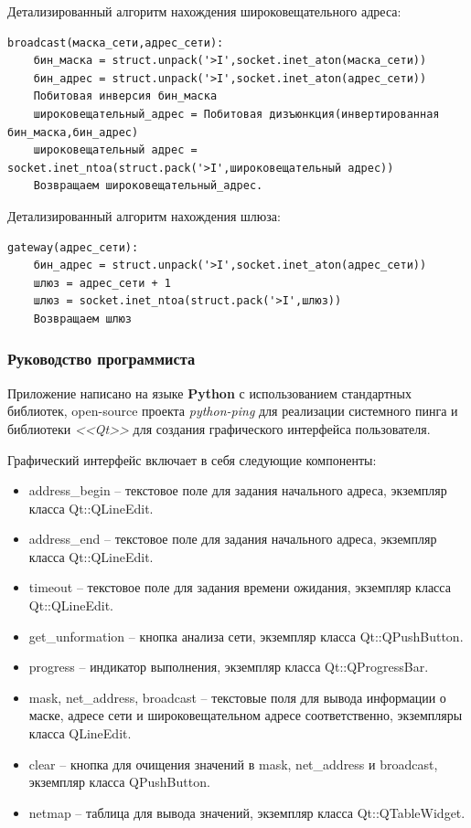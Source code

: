 \documentclass[a4paper]{article}
\begin{document}
Детализированный алгоритм нахождения широковещательного адреса:

\begin{verbatim}
broadcast(маска_сети,адрес_сети):
    бин_маска = struct.unpack('>I',socket.inet_aton(маска_сети))
    бин_адрес = struct.unpack('>I',socket.inet_aton(адрес_сети))
    Побитовая инверсия бин_маска
    широковещательный_адрес = Побитовая дизъюнкция(инвертированная бин_маска,бин_адрес)
    широковещательный адрес = socket.inet_ntoa(struct.pack('>I',широковещательный адрес))
    Возвращаем широковещательный_адрес.
\end{verbatim}

Детализированный алгоритм нахождения шлюза:

\begin{verbatim}
gateway(адрес_сети):
    бин_адрес = struct.unpack('>I',socket.inet_aton(адрес_сети))
    шлюз = адрес_сети + 1
    шлюз = socket.inet_ntoa(struct.pack('>I',шлюз))
    Возвращаем шлюз
\end{verbatim}

		\subsubsection{Руководство программиста}
		Приложение написано на языке \textbf{Python} с использованием стандартных библиотек, open-source проекта \emph{python-ping} для реализации системного пинга и библиотеки \emph{<<Qt>>} для создания графического интерфейса пользователя. 
		
		Графический интерфейс включает в себя следующие компоненты:
		
		\begin{itemize}
			\item address\_begin -- текстовое поле для задания начального адреса, экземпляр класса Qt::QLineEdit.
			\item address\_end -- текстовое поле для задания начального адреса, экземпляр класса Qt::QLineEdit.
			\item timeout -- текстовое поле для задания времени ожидания, экземпляр класса Qt::QLineEdit.
			\item get\_unformation -- кнопка анализа сети, экземпляр класса Qt::QPushButton.
			\item progress -- индикатор выполнения, экземпляр класса Qt::QProgressBar.
			\item mask, net\_address, broadcast -- текстовые поля для вывода информации о маске, адресе сети и широковещательном адресе соответственно, экземпляры класса QLineEdit.
			\item clear -- кнопка для очищения значений в mask, net\_address и broadcast, экземпляр класса QPushButton.
			\item netmap -- таблица для вывода значений, экземпляр класса Qt::QTableWidget.
		\end{itemize}
		
\end{document}
